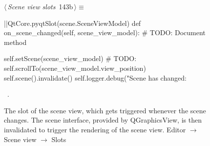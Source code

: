 \documentclass[%
    a4paper,    %
    justified,  %
    nobib,      %
    openany     %
]{tufte-book}
\makeatletter
\renewcommand{\label}[1]{\@tufte@label{##1}}%
\makeatother
\begin{document}
\begin{figure}[!htbp]
\begin{flushleft} \small
\begin{minipage}{\linewidth}\label{scrap96}\raggedright\small
{} $\langle\,${\itshape Scene view slots}\nobreak\ {\footnotesize {143b}}$\,\rangle\equiv$
\vspace{-1ex}
\begin{pythoncode}
|\normalfont{}\fontfamily{}|QtCore.pyqtSlot(scene.SceneViewModel)
def on_scene_changed(self, scene_view_model):
    # TODO: Document method

    self.setScene(scene_view_model)
    # TODO: self.scrollTo(scene_view_model.view_position)
    self.scene().invalidate()
    self.logger.debug("Scene has changed: %
\end{pythoncode}
\vspace{1.5ex}
\footnotesize
\begin{list}{}{\setlength{\itemsep}{-\parsep}\setlength{\itemindent}{-\leftmargin}}
\item \NWtxtMacroRefIn\ .

\item{}
\end{list}
\end{minipage}\vspace{4ex}
\end{flushleft}
\caption{The slot of the scene view, which gets triggered whenever the scene
  changes. The scene interface, provided by QGraphicsView, is then invalidated
  to trigger the rendering of the scene view.
  \newline{}\newline{}Editor $\rightarrow$ Scene view $\rightarrow$
  Slots}
\end{figure}
\end{document}
